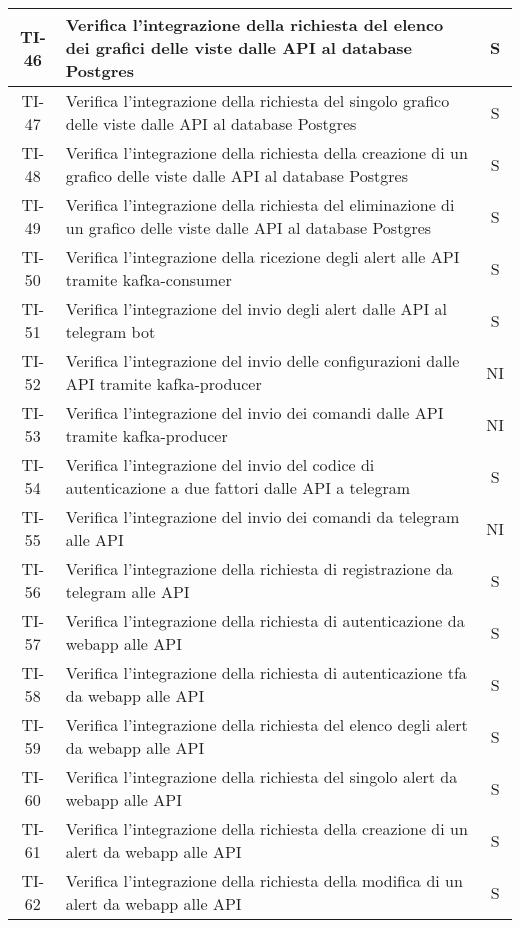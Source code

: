 \begin{center}
\begin{longtable}{|c|p{12cm}|c|}
			\hline
			TI-46 & Verifica l'integrazione della richiesta del elenco dei grafici delle viste dalle API al database Postgres & S \\
			\hline
			TI-47 & Verifica l'integrazione della richiesta del singolo grafico delle viste dalle API al database Postgres & S \\
			\hline
			TI-48 & Verifica l'integrazione della richiesta della creazione di un grafico delle viste dalle API al database Postgres & S \\
			\hline
			TI-49 & Verifica l'integrazione della richiesta del eliminazione di un grafico delle viste dalle API al database Postgres & S \\
			\hline
			TI-50 & Verifica l'integrazione della ricezione degli alert alle API tramite kafka-consumer & S \\
			\hline
			TI-51 & Verifica l'integrazione del invio degli alert dalle API al telegram bot & S \\
			\hline
			TI-52 & Verifica l'integrazione del invio delle configurazioni dalle API tramite kafka-producer & NI \\
			\hline
			TI-53 & Verifica l'integrazione del invio dei comandi dalle API tramite kafka-producer & NI \\
			\hline
			TI-54 & Verifica l'integrazione del invio del codice di autenticazione a due fattori dalle API a telegram & S \\
			\hline
			TI-55 & Verifica l'integrazione del invio dei comandi da telegram alle API & NI \\
			\hline
			TI-56 & Verifica l'integrazione della richiesta di registrazione da telegram alle API & S \\
			\hline
			TI-57 & Verifica l'integrazione della richiesta di autenticazione da webapp alle API & S \\
			\hline
			TI-58 & Verifica l'integrazione della richiesta di autenticazione tfa da webapp alle API & S \\
			\hline
			TI-59 & Verifica l'integrazione della richiesta del elenco degli alert da webapp alle API & S \\
			\hline
			TI-60 & Verifica l'integrazione della richiesta del singolo alert da webapp alle API & S \\
			\hline
			TI-61 & Verifica l'integrazione della richiesta della creazione di un alert da webapp alle API & S \\
			\hline
			TI-62 & Verifica l'integrazione della richiesta della modifica di un alert da webapp alle API & S \\

\end{longtable}
\end{center}
